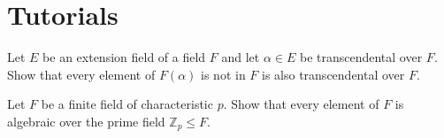 \section*{Tutorials}

\begin{mdframed}
    \vspace{-0.25cm}
    \hspace{-0.25cm}
    \begin{Exercise}
        Let $E$ be an extension field of a field $F$ and let $\alpha \in E$ be transcendental over $F$. Show that every element of $F(\alpha)$ is not in $F$ 
        is also transcendental over $F$. 
    \end{Exercise}

    \vspace{0.752cm}
    \begin{Exercise}
        Let $F$ be a finite field of characteristic $p$. Show that every element of $F$ is algebraic over the 
    prime field $\mathbb{Z}_p \leq F$.
    \end{Exercise}
\end{mdframed}